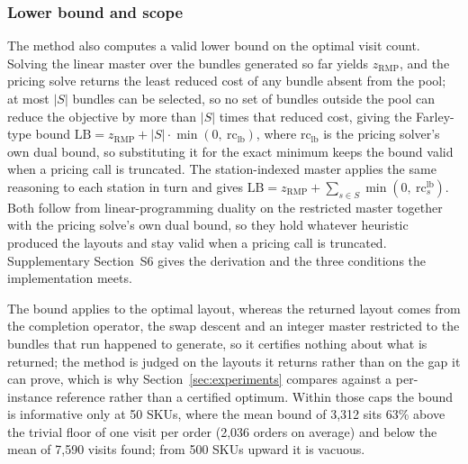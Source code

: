 \documentclass[]{interact}
\begin{document}
\subsubsection{Lower bound and scope}\label{sec:cgbound}
The method also computes a valid lower bound on the optimal visit count. Solving the linear master over the bundles generated so far yields $z_{\mathrm{RMP}}$, and the pricing solve returns the least reduced cost of any bundle absent from the pool; at most $|S|$ bundles can be selected, so no set of bundles outside the pool can reduce the objective by more than $|S|$ times that reduced cost, giving the Farley-type bound \citep{farley1990note} $\mathrm{LB} = z_{\mathrm{RMP}} + |S|\cdot \min(0,\ \mathrm{rc}_{\mathrm{lb}})$, where $\mathrm{rc}_{\mathrm{lb}}$ is the pricing solver's own dual bound, so substituting it for the exact minimum keeps the bound valid when a pricing call is truncated. The station-indexed master applies the same reasoning to each station in turn and gives $\mathrm{LB} = z_{\mathrm{RMP}} + \sum_{s \in S} \min(0,\ \mathrm{rc}^{\mathrm{lb}}_s)$. Both follow from linear-programming duality on the restricted master together with the pricing solve's own dual bound, so they hold whatever heuristic produced the layouts and stay valid when a pricing call is truncated. Supplementary Section~S6 gives the derivation and the three conditions the implementation meets.

The bound applies to the optimal layout, whereas the returned layout comes from the completion operator, the swap descent and an integer master restricted to the bundles that run happened to generate, so it certifies nothing about what is returned; the method is judged on the layouts it returns rather than on the gap it can prove, which is why Section~\ref{sec:experiments} compares against a per-instance reference rather than a certified optimum. Within those caps the bound is informative only at 50 SKUs, where the mean bound of 3,312 sits 63\% above the trivial floor of one visit per order (2,036 orders on average) and below the mean of 7,590 visits found; from 500 SKUs upward it is vacuous.
\end{document}
